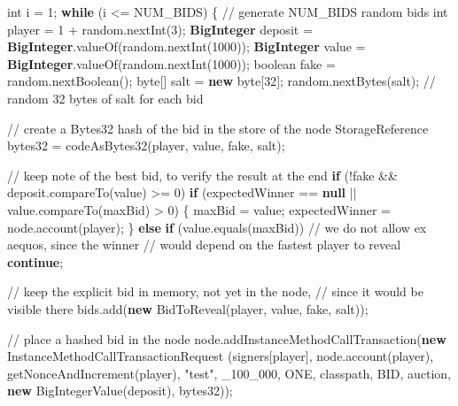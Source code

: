 \documentclass[a4paper,]{book}
\newenvironment{Shaded}{\begin{snugshade}}{\end{snugshade}}
\newcommand{\BuiltInTok}[1]{\textcolor[rgb]{0.39,0.29,0.61}{\textbf{#1}}}
\newcommand{\CommentTok}[1]{\textcolor[rgb]{0.54,0.53,0.53}{#1}}
\newcommand{\DataTypeTok}[1]{\textcolor[rgb]{0.00,0.34,0.68}{#1}}
\newcommand{\DecValTok}[1]{\textcolor[rgb]{0.69,0.50,0.00}{#1}}
\newcommand{\FunctionTok}[1]{\textcolor[rgb]{0.39,0.29,0.61}{#1}}
\newcommand{\KeywordTok}[1]{\textcolor[rgb]{0.12,0.11,0.11}{\textbf{#1}}}
\newcommand{\NormalTok}[1]{\textcolor[rgb]{0.12,0.11,0.11}{#1}}
\newcommand{\StringTok}[1]{\textcolor[rgb]{0.75,0.01,0.01}{#1}}
\renewenvironment{Shaded}{\begin{snugshade}\small}{\end{snugshade}}
\begin{document}
{\begin{Shaded}
\begin{Highlighting}[]
    \DataTypeTok{int}\NormalTok{ i = }\DecValTok{1}\NormalTok{;}
    \KeywordTok{while}\NormalTok{ (i <= NUM_BIDS) \{ }\CommentTok{// generate NUM_BIDS random bids}
      \DataTypeTok{int}\NormalTok{ player = }\DecValTok{1}\NormalTok{ + random.}\FunctionTok{nextInt}\NormalTok{(}\DecValTok{3}\NormalTok{);}
      \BuiltInTok{BigInteger}\NormalTok{ deposit = }\BuiltInTok{BigInteger}\NormalTok{.}\FunctionTok{valueOf}\NormalTok{(random.}\FunctionTok{nextInt}\NormalTok{(}\DecValTok{1000}\NormalTok{));}
      \BuiltInTok{BigInteger}\NormalTok{ value = }\BuiltInTok{BigInteger}\NormalTok{.}\FunctionTok{valueOf}\NormalTok{(random.}\FunctionTok{nextInt}\NormalTok{(}\DecValTok{1000}\NormalTok{));}
      \DataTypeTok{boolean}\NormalTok{ fake = random.}\FunctionTok{nextBoolean}\NormalTok{();}
      \DataTypeTok{byte}\NormalTok{[] salt = }\KeywordTok{new} \DataTypeTok{byte}\NormalTok{[}\DecValTok{32}\NormalTok{];}
\NormalTok{      random.}\FunctionTok{nextBytes}\NormalTok{(salt); }\CommentTok{// random 32 bytes of salt for each bid}

      \CommentTok{// create a Bytes32 hash of the bid in the store of the node}
\NormalTok{      StorageReference bytes32 = }\FunctionTok{codeAsBytes32}\NormalTok{(player, value, fake, salt);}

      \CommentTok{// keep note of the best bid, to verify the result at the end}
      \KeywordTok{if}\NormalTok{ (!fake && deposit.}\FunctionTok{compareTo}\NormalTok{(value) >= }\DecValTok{0}\NormalTok{)}
        \KeywordTok{if}\NormalTok{ (expectedWinner == }\KeywordTok{null}\NormalTok{ || value.}\FunctionTok{compareTo}\NormalTok{(maxBid) > }\DecValTok{0}\NormalTok{) \{}
\NormalTok{          maxBid = value;}
\NormalTok{          expectedWinner = node.}\FunctionTok{account}\NormalTok{(player);}
\NormalTok{        \}}
        \KeywordTok{else} \KeywordTok{if}\NormalTok{ (value.}\FunctionTok{equals}\NormalTok{(maxBid))}
          \CommentTok{// we do not allow ex aequos, since the winner}
          \CommentTok{// would depend on the fastest player to reveal}
          \KeywordTok{continue}\NormalTok{;}

      \CommentTok{// keep the explicit bid in memory, not yet in the node,}
      \CommentTok{// since it would be visible there}
\NormalTok{      bids.}\FunctionTok{add}\NormalTok{(}\KeywordTok{new} \FunctionTok{BidToReveal}\NormalTok{(player, value, fake, salt));}

      \CommentTok{// place a hashed bid in the node}
\NormalTok{      node.}\FunctionTok{addInstanceMethodCallTransaction}\NormalTok{(}\KeywordTok{new}\NormalTok{ InstanceMethodCallTransactionRequest}
\NormalTok{        (signers[player], node.}\FunctionTok{account}\NormalTok{(player),}
         \FunctionTok{getNonceAndIncrement}\NormalTok{(player), }\StringTok{"test"}\NormalTok{,}
\NormalTok{         _}\DecValTok{100_000}\NormalTok{, ONE, classpath, BID,}
\NormalTok{         auction, }\KeywordTok{new} \FunctionTok{BigIntegerValue}\NormalTok{(deposit), bytes32));}


\end{Highlighting}
\end{Shaded}}
\end{document}
